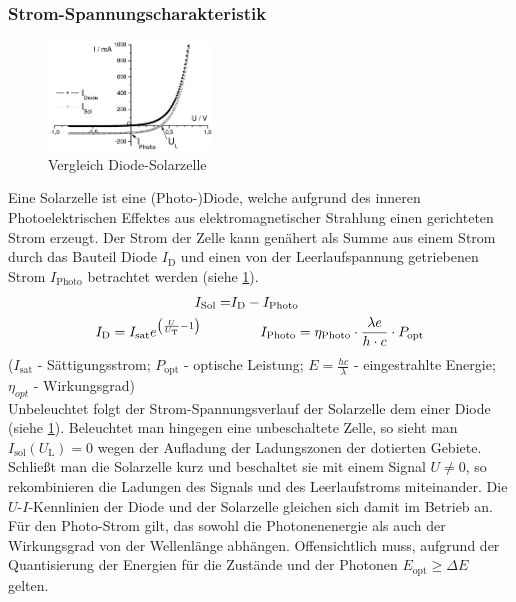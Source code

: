 \documentclass[numbers=noenddot,12pt,a4paper]{scrartcl}
\newcommand{\ix}[1]{_\text{#1}}
\newcommand{\euler}{\mathnormal{e}}
\begin{document}
\subsubsection{Strom-Spannungscharakteristik}
\begin{figure}
	\centering
	\includegraphics[width=0.39\textwidth]{strom.png}
	\caption{Vergleich Diode-Solarzelle} \label{img:strom}
\end{figure}
Eine Solarzelle ist eine (Photo-)Diode, welche aufgrund des inneren Photoelektrischen Effektes aus elektromagnetischer Strahlung einen gerichteten Strom erzeugt. Der Strom der Zelle kann genähert als Summe aus einem Strom durch das Bauteil Diode $I\ix{D}$ und einen von der Leerlaufspannung getriebenen Strom $I\ix{Photo}$ betrachtet werden (siehe \ref{img:strom}).
\begin{align*}
	I\ix{Sol}=&I\ix{D}-I\ix{Photo} \\
	I\ix{D}=I\ix{sat}\euler^{\left(\frac{U}{U\ix{T}}-1\right)} \hspace{0.75cm}&\hspace{0.75cm} I\ix{Photo}=\eta\ix{Photo}\cdot\frac{\lambda \mathnormal{e}}{h\cdot c}\cdot P\ix{opt}
\end{align*}
($I\ix{sat}$ - Sättigungsstrom; $P\ix{opt}$ - optische Leistung; $E=\frac{hc}{\lambda}$ - eingestrahlte Energie; $\eta_{opt}$ - Wirkungsgrad) \\
Unbeleuchtet folgt der Strom-Spannungsverlauf der Solarzelle dem einer Diode (siehe \ref{img:strom}). Beleuchtet man hingegen eine unbeschaltete Zelle, so sieht man $I\ix{sol}(U\ix{L})=0$ wegen der Aufladung der Ladungszonen der dotierten Gebiete.\\
Schließt man die Solarzelle kurz und beschaltet sie mit einem Signal $U\neq0$, so rekombinieren die Ladungen des Signals und des Leerlaufstroms miteinander. Die $U$-$I$-Kennlinien der Diode und der Solarzelle gleichen sich damit im Betrieb an.\\
Für den Photo-Strom gilt, das sowohl die Photonenenergie als auch der Wirkungsgrad von der Wellenlänge abhängen. Offensichtlich muss, aufgrund der Quantisierung der Energien für die Zustände und der Photonen $E\ix{opt}\geq\Delta E$ gelten.
\end{document}
